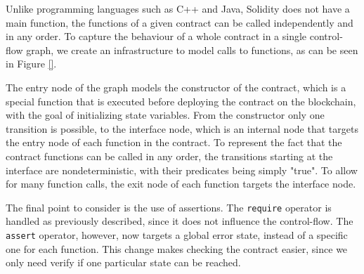 Unlike programming languages such as C++ and Java, Solidity does not have a main function, the functions of a given contract can be called independently and in any order. To capture the behaviour of a whole contract in a single control-flow graph, we create an infrastructure to model calls to functions, as can be seen in Figure \ref{}.

The entry node of the graph models the constructor of the contract, which is a special function that is executed before deploying the contract on the blockchain, with the goal of initializing state variables. From the constructor only one transition is possible, to the interface node, which is an internal node that targets the entry node of each function in the contract. To represent the fact that the contract functions can be called in any order, the transitions starting at the interface are nondeterministic, with their predicates being simply "true". To allow for many function calls, the exit node of each function targets the interface node.

The final point to consider is the use of assertions. The \texttt{require} operator is handled as previously described, since it does not influence the control-flow. The \texttt{assert} operator, however, now targets a global error state, instead of a specific one for each function. This change makes checking the contract easier, since we only need verify if one particular state can be reached. 